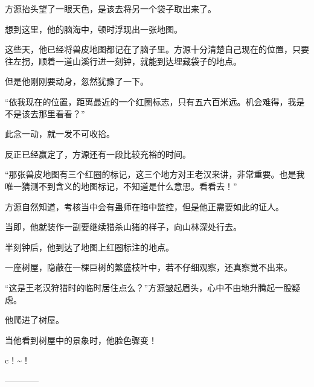 \begin{this_body}
方源抬头望了一眼天色，是该去将另一个袋子取出来了。

想到这里，他的脑海中，顿时浮现出一张地图。

这些天，他已经将兽皮地图都记在了脑子里。方源十分清楚自己现在的位置，只要往左拐，顺着一道山溪行进一刻钟，就能到达埋藏袋子的地点。

但是他刚刚要动身，忽然犹豫了一下。

“依我现在的位置，距离最近的一个红圈标志，只有五六百米远。机会难得，我是不是该去那里看看？”

此念一动，就一发不可收拾。

反正已经赢定了，方源还有一段比较充裕的时间。

“那张兽皮地图有三个红圈的标记，这三个地方对王老汉来讲，非常重要。也是我唯一猜测不到含义的地图标记，不知道是什么意思。看看去！”

方源自然知道，考核当中会有蛊师在暗中监控，但是他正需要如此的证人。

当即，他就装作一副要继续猎杀山猪的样子，向山林深处行去。

半刻钟后，他到达了地图上红圈标注的地点。

一座树屋，隐蔽在一棵巨树的繁盛枝叶中，若不仔细观察，还真察觉不出来。

“这是王老汉狩猎时的临时居住点么？”方源皱起眉头，心中不由地升腾起一股疑虑。

他爬进了树屋。

当他看到树屋中的景象时，他脸色骤变！

c！\~{}！

------------

\end{this_body}

